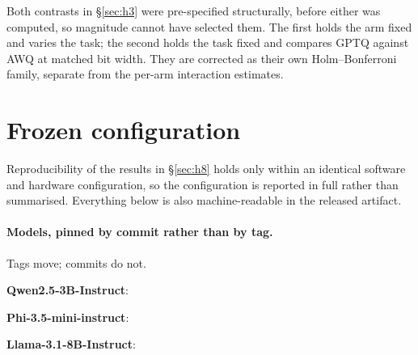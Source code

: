 \documentclass[conference]{IEEEtran}
\begin{document}
Both contrasts in \S\ref{sec:h3} were pre-specified structurally, before either
was computed, so magnitude cannot have selected them. The first holds the arm
fixed and varies the task; the second holds the task fixed and compares GPTQ
against AWQ at matched bit width. They are corrected as their own
Holm--Bonferroni family, separate from the per-arm interaction estimates.

\begin{table}[t]
\centering
\caption{Heterogeneity of the precision $\times$ scoring interaction. Estimates
are differences between two interaction estimates, in accuracy points, with a
percentile cluster bootstrap over items. Contrast~1 is unpaired because the two
tasks have different items; contrast~2 is paired because they share items, and
resampling them independently would discard the correlation and overstate the
interval.}
\label{tab:h3-heterogeneity}
\small

\end{table}

\section{Frozen configuration}
\label{app:config}


Reproducibility of the results in \S\ref{sec:h8} holds only within an identical
software and hardware configuration, so the configuration is reported in full rather
than summarised. Everything below is also machine-readable in the released artifact.

\paragraph{Models, pinned by commit rather than by tag.}
Tags move; commits do not.

\noindent\textbf{Qwen2.5-3B-Instruct}: {\small\texttt{}}\par
\smallskip
\noindent\textbf{Phi-3.5-mini-instruct}: {\small\texttt{}}\par
\smallskip
\noindent\textbf{Llama-3.1-8B-Instruct}: {\small\texttt{}}\par
\end{document}
